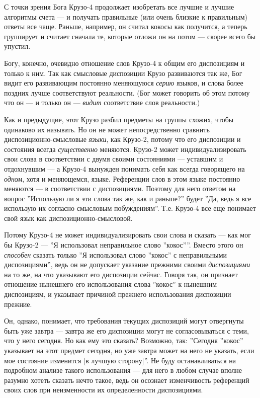 \documentclass[11pt]{book}
\begin{document}
С точки зрения Бога Крузо-4 продолжает изобретать все лучшие и лучшие алгоритмы счета --- и получать правильные (или очень близкие к правильным) ответы все чаще. Раньше, например, он считал кокосы как получится, а теперь группирует и считает сначала те, которые отложи он на потом --- скорее всего бы упустил.

Богу, конечно, очевидно отношение слов Крузо-4 к общим его диспозициям и только к ним. Так как смысловые диспозиции Крузо развиваются так же, Бог видит его развивающим постоянно меняющуюся \textit{серию} языков, и слова более поздних лучше соответствуют реальности. (Бог может говорить об этом потому что он --- и только он --- \textit{видит} соответствие слов реальности.)

Как и предыдущие, этот Крузо разбил предметы на группы схожих, чтобы одинаково их называть. Но он не может непосредственно сравнить диспозиционно-смысловые \textit{языки}, как Крузо-2, потому что его диспозиции и состояния всегда \textit{существенно} меняются. Крузо-2 может индивидуализировать свои слова в соответствии с двумя своими состояниями --- уставшим и отдохнувшим --- а Крузо-4 вынужден понимать себя как всегда говорящего на \textit{одном}, хотя и меняющемся, языке. Референции слов в этом языке постоянно меняются --- в соответствии с диспозициями. Поэтому для него ответом на вопрос ''Использую ли я эти слова так же, как и раньше?'' будет ''Да, ведь я все использую их согласно смысловым побуждениям''. Т.е. Крузо-4 все еще понимает свой язык как диспозиционно-смысловой.

Потому Крузо-4 не может индивидуализировать свои слова и сказать --- как мог бы Крузо-2 --- ''Я использовал неправильное слово ''кокос''''. Вместо этого он \textit{способен} сказать только ''Я использовал слово ''кокос'' с неправильными диспозициями'', ведь он не допускает указание прежними своими \textit{диспозициями} на то же, на что указывают его диспозиции сейчас. Говоря так, он признает отношение нынешнего его использования слова ''кокос'' к нынешним диспозициям, и указывает причиной прежнего использования диспозиции прежние.

Он, однако, понимает, что требования текущих диспозиций могут отвергнуты быть уже завтра --- завтра же его диспозиции могут не согласовываться с теми, что у него сегодня. Но как ему это сказать? Возможно, так: ''Сегодня ''кокос'' указывает на этот предмет сегодня, но уже завтра может на него не указать, если мое состояние изменится [в лучшую сторону]''. Не буду останавливаться на подробном анализе такого использования --- для него в любом случае вполне разумно хотеть сказать нечто такое, ведь он осознает изменчивость референций своих слов при неизменности их определенности диспозициями.
\end{document}
